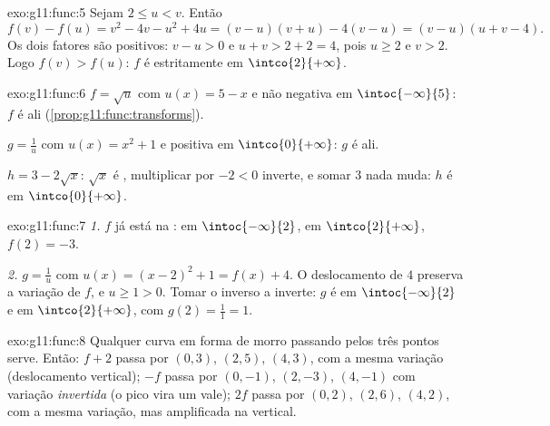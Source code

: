 \begin{solution}{exo:g11:func:5}
Sejam $2 \leq u < v$. Então
\[
f(v) - f(u) = v^2 - 4v - u^2 + 4u = (v-u)(v+u) - 4(v-u)
= (v - u)(u + v - 4).
\]
Os dois fatores são positivos: $v - u > 0$ e $u + v > 2 + 2 = 4$, pois
$u \geq 2$ e $v > 2$. Logo $f(v) > f(u)$: $f$ é estritamente  em
$\intco{2}{+\infty}$.
\end{solution}

\begin{solution}{exo:g11:func:6}
$f = \sqrt{u}$ com $u(x) = 5 - x$  e não negativa em
$\intoc{-\infty}{5}$: $f$ é  ali
(\cref{prop:g11:func:transforms}).

$g = \frac1u$ com $u(x) = x^2 + 1$  e positiva em
$\intco{0}{+\infty}$: $g$ é  ali.

$h = 3 - 2\sqrt x$: $\sqrt x$ é , multiplicar por $-2 < 0$
inverte, e somar $3$ nada muda: $h$ é  em
$\intco{0}{+\infty}$.
\end{solution}

\begin{solution}{exo:g11:func:7}
\emph{1.} $f$ já está na :  em
$\intoc{-\infty}{2}$,  em $\intco{2}{+\infty}$, 
$f(2) = -3$.

\emph{2.} $g = \frac{1}{u}$ com $u(x) = (x-2)^2 + 1 = f(x) + 4$. O
deslocamento de $4$ preserva a variação de $f$, e $u \geq 1 > 0$. Tomar o
inverso a inverte: $g$ é  em $\intoc{-\infty}{2}$ e 
em $\intco{2}{+\infty}$, com  $g(2) = \frac{1}{1} = 1$.
\end{solution}

\begin{solution}{exo:g11:func:8}
Qualquer curva em forma de morro passando pelos três pontos serve.
Então: $f + 2$ passa por $(0,3)$, $(2,5)$, $(4,3)$, com a mesma variação
(deslocamento vertical); $-f$ passa por $(0,-1)$, $(2,-3)$, $(4,-1)$ com
variação \emph{invertida} (o pico vira um vale); $2f$ passa por $(0,2)$,
$(2,6)$, $(4,2)$, com a mesma variação, mas amplificada na vertical.
\end{solution}

